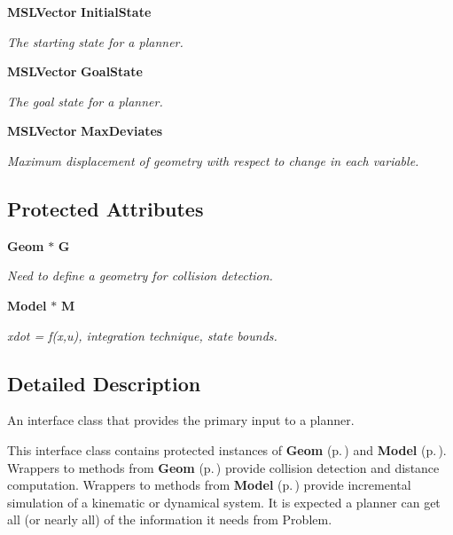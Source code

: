 \begin{CompactItemize}
{\bf MSLVector} {\bf Initial\-State}
\begin{CompactList}\small\item\em The starting state for a planner.\item\end{CompactList}\item 
{\bf MSLVector} {\bf Goal\-State}
\begin{CompactList}\small\item\em The goal state for a planner.\item\end{CompactList}\item 
{\bf MSLVector} {\bf Max\-Deviates}
\begin{CompactList}\small\item\em Maximum displacement of geometry with respect to change in each variable.\item\end{CompactList}\end{CompactItemize}
\subsection*{Protected Attributes}
\begin{CompactItemize}
\item 
{\bf Geom} $\ast$ {\bf G}
\begin{CompactList}\small\item\em Need to define a geometry for collision detection.\item\end{CompactList}\item 
{\bf Model} $\ast$ {\bf M}
\begin{CompactList}\small\item\em xdot = f(x,u), integration technique, state bounds.\item\end{CompactList}\end{CompactItemize}


\subsection{Detailed Description}
An interface class that provides the primary input to a planner.

This interface class contains protected instances of {\bf Geom} {\rm (p.\,\pageref{classGeom})} and {\bf Model} {\rm (p.\,\pageref{classModel})}. Wrappers to methods from {\bf Geom} {\rm (p.\,\pageref{classGeom})} provide collision detection and distance computation. Wrappers to methods from {\bf Model} {\rm (p.\,\pageref{classModel})} provide incremental simulation of a kinematic or dynamical system. It is expected a planner can get all (or nearly all) of the information it needs from Problem. 



